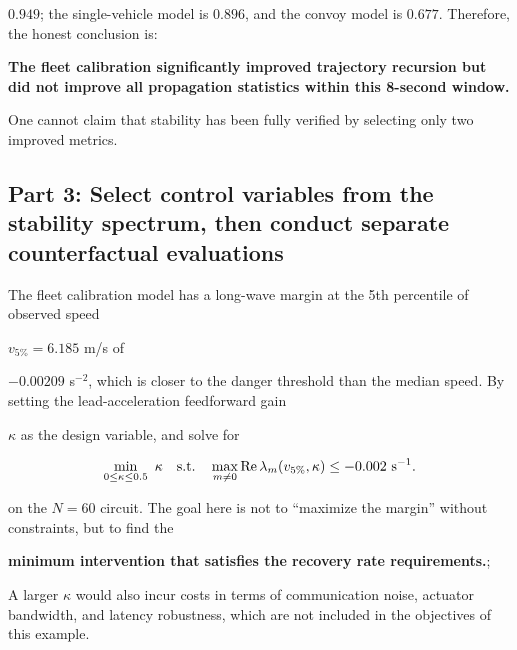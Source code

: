 \documentclass[11pt,a4paper,openany]{book}
\numberwithin{equation}{chapter}
\numberwithin{figure}{chapter}
\numberwithin{table}{chapter}
\begin{document}
$0.949$; the single-vehicle model is $0.896$, and the convoy model is $0.677$. Therefore, the honest conclusion is:







\textbf{The fleet calibration significantly improved trajectory recursion but did not improve all propagation statistics within this 8-second window.}







One cannot claim that stability has been fully verified by selecting only two improved metrics.










\subsection{Part 3: Select control variables from the stability spectrum, then conduct separate counterfactual evaluations}





The fleet calibration model has a long-wave margin at the 5th percentile of observed speed

$v_{5\%}=6.185$ m/s of

$-0.00209$ s$^{-2}$, which is closer to the danger threshold than the median speed. By setting the lead-acceleration feedforward gain

$\kappa$ as the design variable, and solve for

\begin{equation}
\min_{0\le\kappa\le0.5}\ \kappa
\quad\text{s.t.}\quad
\max_{m\ne0}\operatorname{Re}\lambda_m(v_{5\%},\kappa)
\le-0.002\ {\rm s}^{-1}.
\label{eq:ngsim-stability-optimization}
\end{equation}

on the $N=60$ circuit. The goal here is not to “maximize the margin” without constraints, but to find the




\textbf{minimum intervention that satisfies the recovery rate requirements.};

A larger $\kappa$ would also incur costs in terms of communication noise, actuator bandwidth, and latency robustness, which are not included in the objectives of this example.
\end{document}
